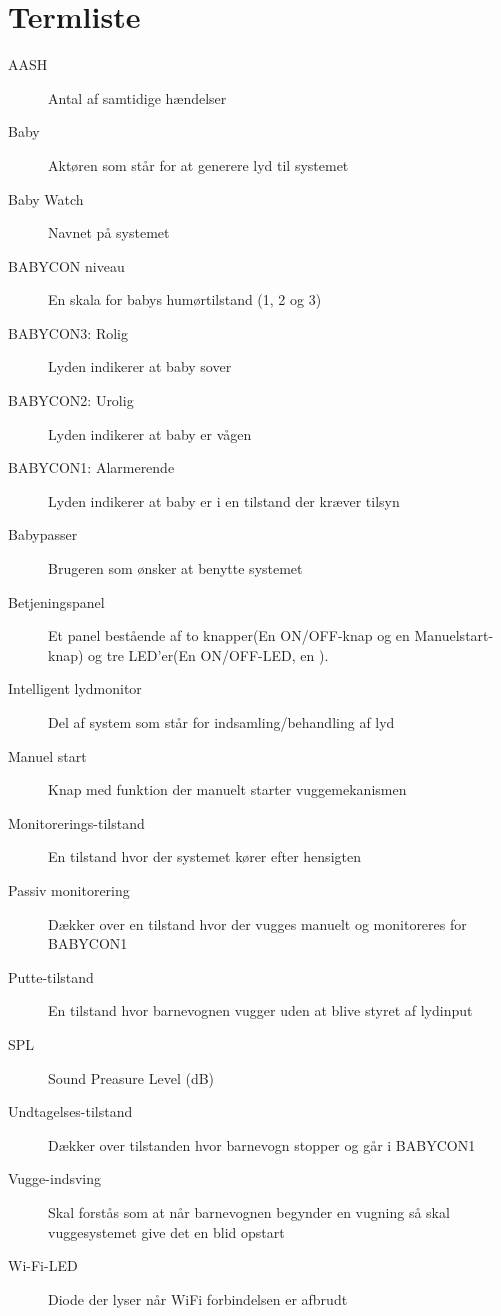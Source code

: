\chapter{Termliste}


\begin{description}
\item[AASH] Antal af samtidige hændelser
\item[Baby] Aktøren som står for at generere lyd til systemet
\item[Baby Watch] Navnet på systemet
\item[BABYCON niveau] En skala for babys humørtilstand (1, 2 og 3)
\item[BABYCON3: Rolig] Lyden indikerer at baby sover
\item[BABYCON2: Urolig] Lyden indikerer at baby er vågen
\item[BABYCON1: Alarmerende] Lyden indikerer at baby er i en tilstand der kræver tilsyn
\item[Babypasser] Brugeren som ønsker at benytte systemet
\item[Betjeningspanel]Et panel bestående af to knapper(En ON/OFF-knap og en Manuelstart-knap) og tre LED'er(En ON/OFF-LED, en ). 
\item[Intelligent lydmonitor] Del af system som står for indsamling/behandling af lyd
\item[Manuel start] Knap med funktion der manuelt starter vuggemekanismen
\item[Monitorerings-tilstand] En tilstand hvor der systemet kører efter hensigten
\item[Passiv monitorering] Dækker over en tilstand hvor der vugges manuelt og monitoreres for BABYCON1
\item[Putte-tilstand] En tilstand hvor barnevognen vugger uden at blive styret af lydinput
\item[SPL] Sound Preasure Level (dB)
\item[Undtagelses-tilstand] Dækker over tilstanden hvor barnevogn stopper og går i BABYCON1
\item[Vugge-indsving] Skal forstås som at når barnevognen begynder en vugning så skal vuggesystemet give det en blid opstart
\item[Wi-Fi-LED]Diode der lyser når WiFi forbindelsen er afbrudt





\end{description}